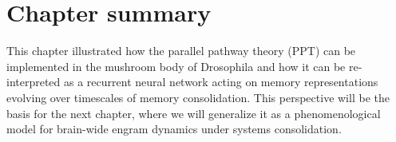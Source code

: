 \section{Chapter summary}
This chapter illustrated how the parallel pathway theory (PPT) can be implemented in the mushroom body of Drosophila and how it can be re-interpreted as a recurrent neural network acting on memory representations evolving over timescales of memory consolidation. This perspective will be the basis for the next chapter, where we will generalize it as a phenomenological model for brain-wide engram dynamics under systems consolidation.



%
%





